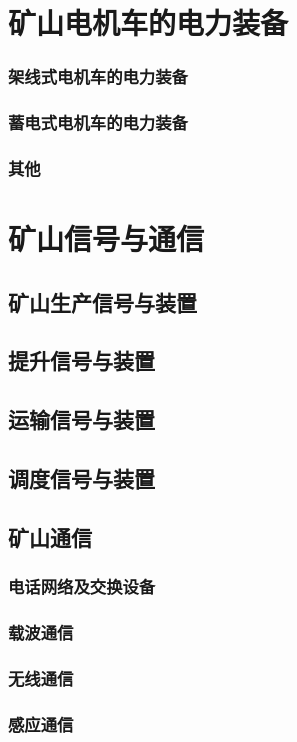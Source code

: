 \documentclass[UTF8]{../../ApplicationUniverse}
\begin{document}
\section{矿山电机车的电力装备}
    \subsubsection{架线式电机车的电力装备}
    \subsubsection{蓄电式电机车的电力装备}
    \subsubsection{其他}
\section{矿山信号与通信}
    \subsection{矿山生产信号与装置}
    \subsection{提升信号与装置}
    \subsection{运输信号与装置}
    \subsection{调度信号与装置}
    \subsection{矿山通信}
        \subsubsection{电话网络及交换设备}
        \subsubsection{载波通信}
        \subsubsection{无线通信}
        \subsubsection{感应通信}
\end{document}
